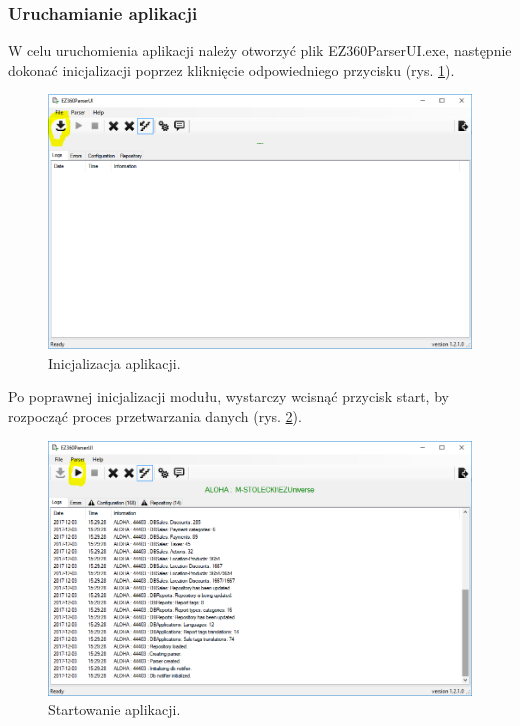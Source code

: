 \documentclass[a4paper]{book}
\begin{document}
\subsubsection{Uruchamianie aplikacji}
W celu uruchomienia aplikacji należy otworzyć plik EZ360ParserUI.exe, następnie dokonać inicjalizacji poprzez kliknięcie odpowiedniego przycisku (rys. \ref{fig:inicjalizacja_aplikacji}).
\begin{figure}[h]
	\centering
	\includegraphics[width=\textwidth]{./img/inicjalizacja_aplikacji.png}
	\caption{Inicjalizacja aplikacji.}
	\label{fig:inicjalizacja_aplikacji}
\end{figure}
Po poprawnej inicjalizacji modułu, wystarczy wcisnąć przycisk start, by rozpocząć proces przetwarzania danych (rys. \ref{fig:startowanie_aplikacji}).
\begin{figure}[h]
	\centering
	\includegraphics[width=\textwidth]{./img/startowanie_aplikacji.png}
	\caption{Startowanie aplikacji.}
	\label{fig:startowanie_aplikacji}
\end{figure}
\end{document}
